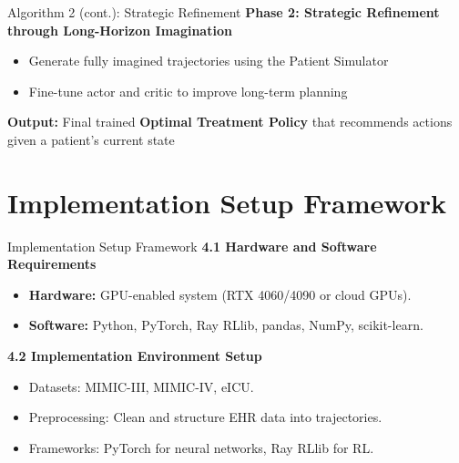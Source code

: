 \documentclass[11pt]{beamer}
\begin{document}
\begin{frame}{Algorithm 2 (cont.): Strategic Refinement}
\textbf{Phase 2: Strategic Refinement through Long-Horizon Imagination}  
\begin{itemize}
    \item Generate fully imagined trajectories using the Patient Simulator
    \item Fine-tune actor and critic to improve long-term planning
\end{itemize}

\textbf{Output:} Final trained \textbf{Optimal Treatment Policy} that recommends actions given a patient’s current state
\end{frame}

\section{Implementation Setup Framework}
\begin{frame}{Implementation Setup Framework}
\textbf{4.1 Hardware and Software Requirements}  
\begin{itemize}
    \item \textbf{Hardware:} GPU-enabled system (RTX 4060/4090 or cloud GPUs).
    \item \textbf{Software:} Python, PyTorch, Ray RLlib, pandas, NumPy, scikit-learn.
\end{itemize}

\textbf{4.2 Implementation Environment Setup}  
\begin{itemize}
    \item Datasets: MIMIC-III, MIMIC-IV, eICU.
    \item Preprocessing: Clean and structure EHR data into trajectories.
    \item Frameworks: PyTorch for neural networks, Ray RLlib for RL.
\end{itemize}
\end{frame}

\end{document}
